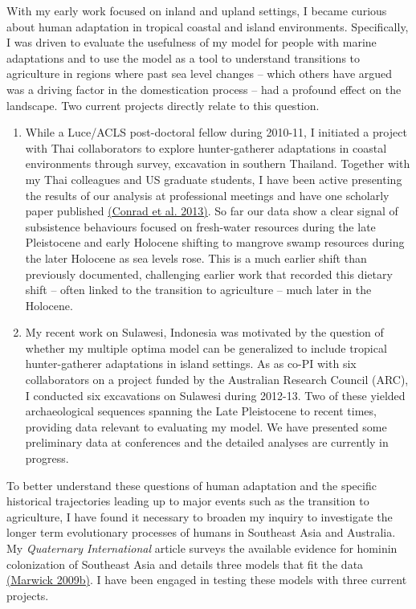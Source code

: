 \documentclass[11pt,article,oneside]{memoir}
\begin{document}
With my early work focused on inland and upland settings, I became curious about human adaptation in tropical coastal and island environments. Specifically, I was driven to evaluate the usefulness of my model for people with marine adaptations and to use the model as a tool to understand transitions to agriculture in regions where past sea level changes – which others have argued was a driving factor in the domestication process –  had a profound effect on the landscape. Two current projects directly relate to this question.

\begin{enumerate}

\item While a Luce/ACLS post-doctoral fellow during 2010-11, I initiated a project with Thai collaborators to explore hunter-gatherer adaptations in coastal environments through survey, excavation in southern Thailand. Together with my Thai colleagues and US graduate students, I have been active presenting the results of our analysis at professional meetings and have one scholarly paper published {\href{http://faculty.washington.edu/bmarwick/PDFs/Conrad_et_al_2013_TNHMJ.pdf}{(Conrad et al. 2013)}}. So far our data show a clear signal of subsistence behaviours focused on fresh-water resources during the late Pleistocene and early Holocene shifting to mangrove swamp resources during the later Holocene as sea levels rose.  This is a much earlier shift than previously documented, challenging earlier work that recorded this dietary shift – often linked to the transition to agriculture – much later in the Holocene. 

\item My recent work on Sulawesi, Indonesia was motivated by the question of whether my multiple optima model can be generalized to include tropical hunter-gatherer adaptations in island settings. As as co-PI with six collaborators on a project funded by the Australian Research Council (ARC), I conducted six excavations on Sulawesi during 2012-13. Two of these yielded archaeological sequences spanning the Late Pleistocene to recent times, providing data relevant to evaluating my model. We have presented some preliminary data at conferences and the detailed analyses are currently in progress. 

\end{enumerate}

To better understand these questions of human adaptation and the specific historical trajectories leading up to major events such as the transition to agriculture, I have found it necessary to broaden my inquiry to investigate the longer term evolutionary processes of humans in Southeast Asia and Australia.  My \textit{ Quaternary International} article surveys the available evidence for hominin colonization of Southeast Asia and details three models that fit the data {\href{http://faculty.washington.edu/bmarwick/PDFs/Marwick_2009_QI.pdf}{(Marwick 2009b)}}. I have been engaged in testing these models with three current projects. 
\end{document}
